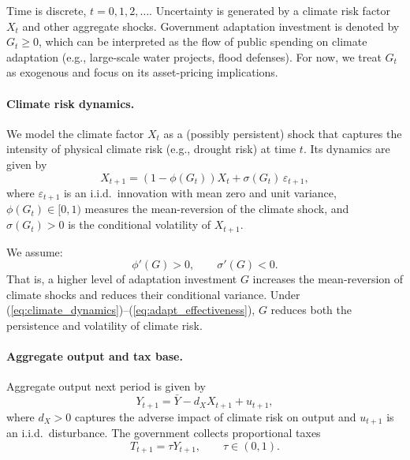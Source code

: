 \documentclass[12pt]{article}
\begin{document}
Time is discrete, $t = 0,1,2,\ldots$. Uncertainty is generated by a climate
risk factor $X_t$ and other aggregate shocks. Government adaptation
investment is denoted by $G_t \ge 0$, which can be interpreted as the flow
of public spending on climate adaptation (e.g., large-scale water projects,
flood defenses). For now, we treat $G_t$ as exogenous and focus on its
asset-pricing implications.

\paragraph{Climate risk dynamics.}
We model the climate factor $X_t$ as a (possibly persistent) shock that
captures the intensity of physical climate risk (e.g., drought risk) at
time $t$. Its dynamics are given by
\begin{equation}
  X_{t+1} = (1 - \phi(G_t)) X_t + \sigma(G_t)\,\varepsilon_{t+1},
  \label{eq:climate_dynamics}
\end{equation}
where $\varepsilon_{t+1}$ is an i.i.d.\ innovation with mean zero and unit
variance, $\phi(G_t) \in [0,1)$ measures the mean-reversion of the climate
shock, and $\sigma(G_t) > 0$ is the conditional volatility of $X_{t+1}$.



We assume:
\begin{equation}
  \phi'(G) > 0, 
  \qquad
  \sigma'(G) < 0.
  \label{eq:adapt_effectiveness}
\end{equation}
That is, a higher level of adaptation investment $G$ increases the
mean-reversion of climate shocks and reduces their conditional variance.
Under (\ref{eq:climate_dynamics})--(\ref{eq:adapt_effectiveness}), $G$
reduces both the persistence and volatility of climate risk.

\paragraph{Aggregate output and tax base.}
Aggregate output next period is given by
\begin{equation}
  Y_{t+1} = \bar{Y} - d_X X_{t+1} + u_{t+1},
  \label{eq:output}
\end{equation}
where $d_X > 0$ captures the adverse impact of climate risk on output and
$u_{t+1}$ is an i.i.d.\ disturbance. The government collects proportional
taxes
\begin{equation*}
  T_{t+1} = \tau Y_{t+1}, \qquad \tau \in (0,1).
  \label{eq:tax}
\end{equation*}
\end{document}
